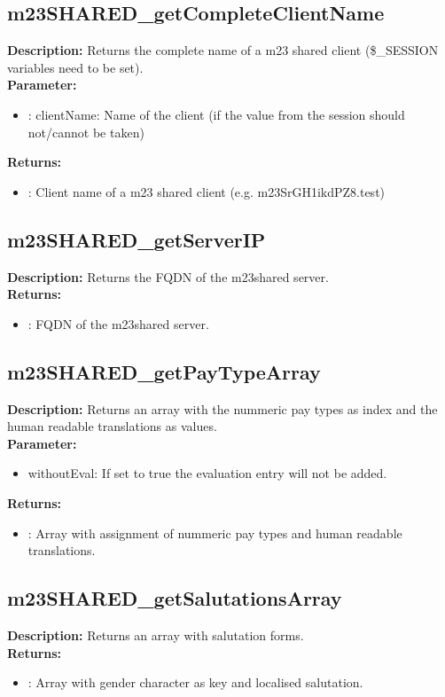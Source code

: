\subsection{m23SHARED\_getCompleteClientName}
\textbf{Description:} Returns the complete name of a m23 shared client (\$\_SESSION variables need to be set).\\
\textbf{Parameter:}
\begin{itemize}
\item : clientName: Name of the client (if the value from the session should not/cannot be taken)
\end{itemize}
\textbf{Returns:}
\begin{itemize}
\item : Client name of a m23 shared client (e.g. m23SrGH1ikdPZ8.test)
\end{itemize}

\subsection{m23SHARED\_getServerIP}
\textbf{Description:} Returns the FQDN of the m23shared server.\\
\textbf{Returns:}
\begin{itemize}
\item : FQDN of the m23shared server.
\end{itemize}

\subsection{m23SHARED\_getPayTypeArray}
\textbf{Description:} Returns an array with the nummeric pay types as index and the human readable translations as values.\\
\textbf{Parameter:}
\begin{itemize}
\item withoutEval: If set to true the evaluation entry will not be added.
\end{itemize}
\textbf{Returns:}
\begin{itemize}
\item : Array with assignment of nummeric pay types and human readable translations.
\end{itemize}

\subsection{m23SHARED\_getSalutationsArray}
\textbf{Description:} Returns an array with salutation forms.\\
\textbf{Returns:}
\begin{itemize}
\item : Array with gender character as key and localised salutation.
\end{itemize}

